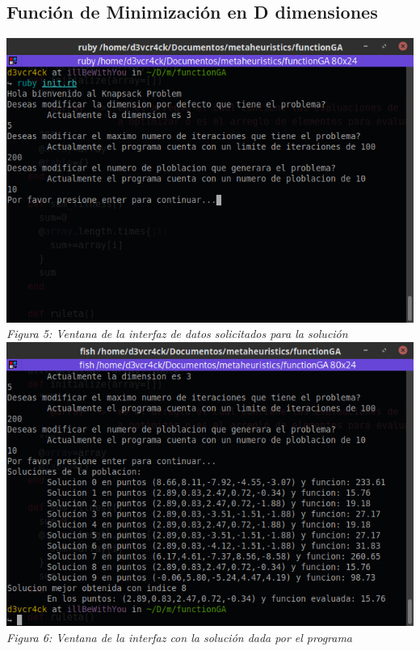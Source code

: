\documentclass[10pt]{article}
\begin{document}
\subsection{Función de Minimización en D dimensiones}
\begin{center}
  \includegraphics[scale=0.5]{imgs/ventana-func.png}
  \\\textit{Figura 5: Ventana de la interfaz de datos solicitados para la solución}
  \\
  \includegraphics[scale=0.5]{imgs/ventana-func-sol.png}
  \\\textit{Figura 6: Ventana de la interfaz con la solución dada por el programa}
\end{center}
\end{document}
